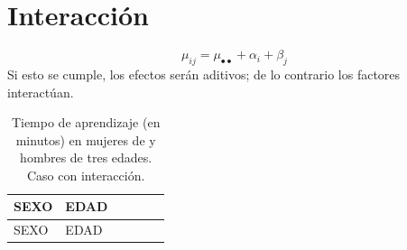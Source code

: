 \documentclass[]{book}
\theoremstyle{definition}
\theoremstyle{definition}
\theoremstyle{definition}
\theoremstyle{remark}
\begin{document}
\hypertarget{interaccion}{%
\section{Interacción}\label{interaccion}}

\[
\mu_{ij} = \mu_{\bullet\bullet} + \alpha_i + \beta_j
\] Si esto se cumple, los efectos serán aditivos; de lo contrario los
factores interactúan.

\begin{longtable}[]{@{}llllll@{}}
\caption{\label{tab:aprendizaje3} Tiempo de aprendizaje (en minutos) en
mujeres de y hombres de tres edades. Caso con
interacción.}\tabularnewline
\toprule
\begin{minipage}[b]{0.12\columnwidth}\raggedright
SEXO\strut
\end{minipage} & \begin{minipage}[b]{0.19\columnwidth}\raggedright
EDAD\strut
\end{minipage} & \begin{minipage}[b]{0.13\columnwidth}\raggedright
\strut
\end{minipage} & \begin{minipage}[b]{0.12\columnwidth}\raggedright
\strut
\end{minipage} & \begin{minipage}[b]{0.16\columnwidth}\raggedright
\strut
\end{minipage} & \begin{minipage}[b]{0.11\columnwidth}\raggedright
\strut
\end{minipage}\tabularnewline
\midrule
\endfirsthead
\toprule
\begin{minipage}[b]{0.12\columnwidth}\raggedright
SEXO\strut
\end{minipage} & \begin{minipage}[b]{0.19\columnwidth}\raggedright
EDAD\strut
\end{minipage} & \begin{minipage}[b]{0.13\columnwidth}\raggedright
\strut
\end{minipage} & \begin{minipage}[b]{0.12\columnwidth}\raggedright
\strut
\end{minipage} & \begin{minipage}[b]{0.16\columnwidth}\raggedright
\strut
\end{minipage} & \begin{minipage}[b]{0.11\columnwidth}\raggedright
\strut
\end{minipage}\tabularnewline

\end{longtable}
\end{document}
